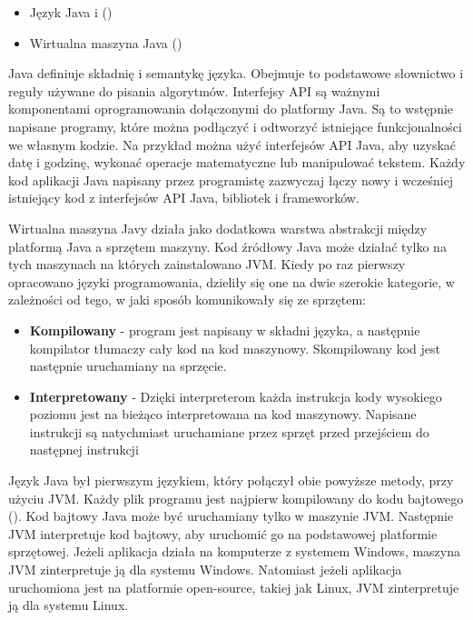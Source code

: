 \begin{itemize}
    \item Język Java i ()
    \item Wirtualna maszyna Java  ()
\end{itemize}

Java definiuje składnię i semantykę języka. Obejmuje to podstawowe słownictwo i reguły używane do pisania algorytmów. 
Interfejsy API są ważnymi komponentami oprogramowania dołączonymi do platformy Java. Są to wstępnie napisane programy, które można podłączyć i odtworzyć istniejące funkcjonalności we własnym kodzie. Na przykład można użyć interfejsów API Java, aby uzyskać datę i godzinę, wykonać operacje matematyczne lub manipulować tekstem. Każdy kod aplikacji Java napisany przez programistę zazwyczaj łączy nowy i wcześniej istniejący kod z interfejsów API Java, bibliotek i frameworków\cite{frameworkDef}\cite{javaAmazon}\cite{javaDEV}.

Wirtualna maszyna Javy działa jako dodatkowa warstwa abstrakcji między platformą Java a sprzętem maszyny. Kod źródłowy Java może działać tylko na tych maszynach na których zainstalowano JVM. Kiedy po raz pierwszy opracowano języki programowania, dzieliły się one na dwie szerokie kategorie, w zależności od tego, w jaki sposób komunikowały się ze sprzętem: 

\begin{itemize}
    \item \textbf{Kompilowany} - program jest napisany w składni języka, a następnie kompilator tłumaczy cały kod na kod maszynowy. Skompilowany kod jest następnie uruchamiany na sprzęcie.
    \item \textbf{Interpretowany} - Dzięki interpreterom każda instrukcja kody wysokiego poziomu jest na bieżąco interpretowana na kod maszynowy. Napisane instrukcji są natychmiast uruchamiane przez sprzęt przed przejściem do następnej instrukcji
\end{itemize}

Język Java był pierwszym językiem, który połączył obie powyższe metody, przy użyciu JVM. Każdy plik programu jest najpierw kompilowany do kodu bajtowego (). Kod bajtowy Java może być uruchamiany tylko w maszynie JVM. Następnie JVM interpretuje kod bajtowy, aby uruchomić go na podstawowej platformie sprzętowej. Jeżeli aplikacja działa na komputerze z systemem Windows, maszyna JVM zinterpretuje ją dla systemu Windows. Natomiast jeżeli aplikacja uruchomiona jest na platformie open-source, takiej jak Linux, JVM zinterpretuje ją dla systemu Linux\cite{javaAmazon}\cite{javaDEV}.

